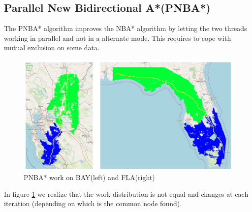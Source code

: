 \documentclass[twocolumn, switch]{article} %
\begin{document}
\subsection{Parallel New Bidirectional A*(PNBA*)}
The PNBA* algorithm improves the NBA* algorithm by letting the two threads working in
parallel and not in a alternate mode. This requires to cope with mutual exclusion on some data.
\begin{figure}[ht!]
  \centering
  \includegraphics[width=1\linewidth]{pnba/pnbamap.png}
  \caption{PNBA* work on BAY(left) and FLA(right)}
  \label{pnbamap}
\end{figure}
In figure \ref{pnbamap} we realize that the work distribution is not equal and changes 
at each iteration (depending on which is the common node found).
\end{document}
